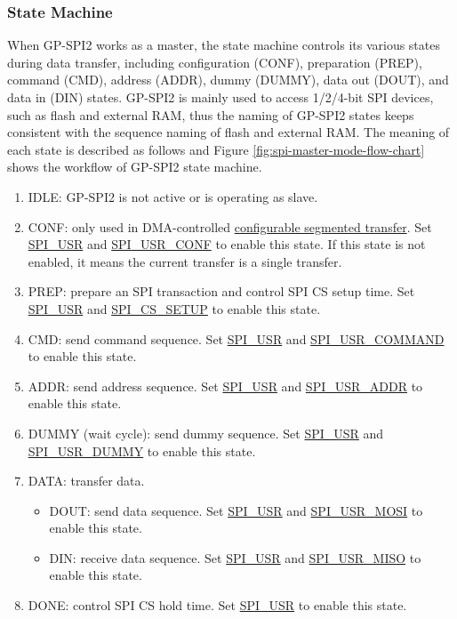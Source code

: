 \documentclass[main\_\_EN.tex]{subfiles}
\begin{document}
\subsubsection{State Machine}
\label{sec:gp-spi2-state-machine}

When GP-SPI2 works as a master, the state machine controls its various states during data transfer, including configuration (CONF), preparation (PREP), command (CMD), address (ADDR), dummy (DUMMY), data out (DOUT), and data in (DIN) states. GP-SPI2 is mainly used to access 1/2/4-bit SPI devices, such as flash and external RAM, thus the naming of GP-SPI2 states keeps consistent with the sequence naming of flash and external RAM. The meaning of each state is described as follows and Figure \ref{fig:spi-master-mode-flow-chart} shows the workflow of GP-SPI2 state machine.

\begin{enumerate}
    \item IDLE: GP-SPI2 is not active or is operating as slave.
    \item CONF: only used in DMA-controlled \hyperref[sec:gp-spi-dma-seg-conf-trans]{configurable segmented transfer}. Set \hyperref[fielddesc:SPIUSR]{SPI\_USR} and \hyperref[fielddesc:SPIUSRCONF]{SPI\_USR\_CONF} to enable this state. If this state is not enabled, it means the current transfer is a single transfer. 
    \item PREP: prepare an SPI transaction and control SPI CS setup time. Set \hyperref[fielddesc:SPIUSR]{SPI\_USR} and \hyperref[fielddesc:SPICSSETUP]{SPI\_CS\_SETUP} to enable this state. 
    \item\label{phase:cmd} CMD: send command sequence. Set \hyperref[fielddesc:SPIUSR]{SPI\_USR} and \hyperref[fielddesc:SPIUSRCOMMAND]{SPI\_USR\_COMMAND} to enable this state. 
    \item\label{phase:addr} ADDR: send address sequence. Set \hyperref[fielddesc:SPIUSR]{SPI\_USR} and \hyperref[fielddesc:SPIUSRADDR]{SPI\_USR\_ADDR} to enable this state. 
    \item DUMMY (wait cycle): send dummy sequence. Set \hyperref[fielddesc:SPIUSR]{SPI\_USR} and \hyperref[fielddesc:SPIUSRDUMMY]{SPI\_USR\_DUMMY} to enable this state. 
    \item\label{phase:data} DATA: transfer data.
    \begin{itemize}
    \item DOUT: send data sequence. Set \hyperref[fielddesc:SPIUSR]{SPI\_USR} and \hyperref[fielddesc:SPIUSRMOSI]{SPI\_USR\_MOSI} to enable this state. 
    \item DIN: receive data sequence. Set \hyperref[fielddesc:SPIUSR]{SPI\_USR} and \hyperref[fielddesc:SPIUSRMISO]{SPI\_USR\_MISO} to enable this state. 
    \end{itemize}
    \item DONE: control SPI CS hold time. Set \hyperref[fielddesc:SPIUSR]{SPI\_USR} to enable this state. 
\end{enumerate}
\end{document}
